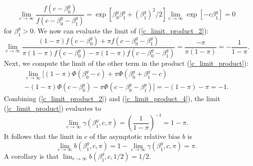 \documentclass[11pt]{article}
\begin{document}
\begin{appendices}
\begin{refsection}
$$
\lim_{c \to \infty} \frac{f(c - \beta^g_0)}{f(c - \beta^g_0 - \beta^g_1)} = \exp[ \beta^g_0 \beta^g_1 + (\beta^g_1)^2/2] \lim_{c \to \infty} \exp[ -c \beta^g_1] = 0
$$ for $\beta^g_1 > 0$. We now can evaluate the limit of (\ref{c_limit_product_2}):
$$ \lim_{c \to \infty} \frac{(1-\pi) f(c - \beta^g_0) + \pi f(c - \beta^g_0 - \beta^g_1)}{\pi (1-\pi) f(c - \beta^g_0) - \pi (1-\pi)f(c - \beta^g_0 - \beta^g_1)} = \frac{-\pi}{\pi(1-\pi)} = -\frac{1}{1 -\pi}.$$ Next, we compute the limit of the other term in the product (\ref{c_limit_product}):
\begin{multline}\label{c_limit_product_4}
\lim_{c \to \infty} \bigg[ (1-\pi)\Phi(\beta_0^g - c) + \pi \Phi(\beta^g_0 + \beta^g_1 - c) \\ - (1-\pi)\Phi(c - \beta^g_0) - \pi \Phi(c - \beta_0^g - \beta_1^g) \bigg] = -(1-\pi) - \pi = -1.
\end{multline}
Combining (\ref{c_limit_product_2}) and (\ref{c_limit_product_4}), the limit (\ref{c_limit_product}) evaluates to
$$ \lim_{c \to \infty} \gamma(\beta^g_1, c, \pi) = \left(  \frac{ 1 }{ 1 - \pi }\right)^{-1} = 1 - \pi.$$ It follows that the limit in $c$ of the asymptotic relative bias $b$ is
$$\lim_{c \to \infty} b(\beta^g_1, c, \pi) = 1 - \lim_{c \to \infty} \gamma(\beta^g_1, c, \pi) = \pi.$$
A corollary is that
$\lim_{c \to \infty} b(\beta^g_1, c, 1/2) = 1/2.$


\end{refsection}
\end{appendices}
\end{document}
